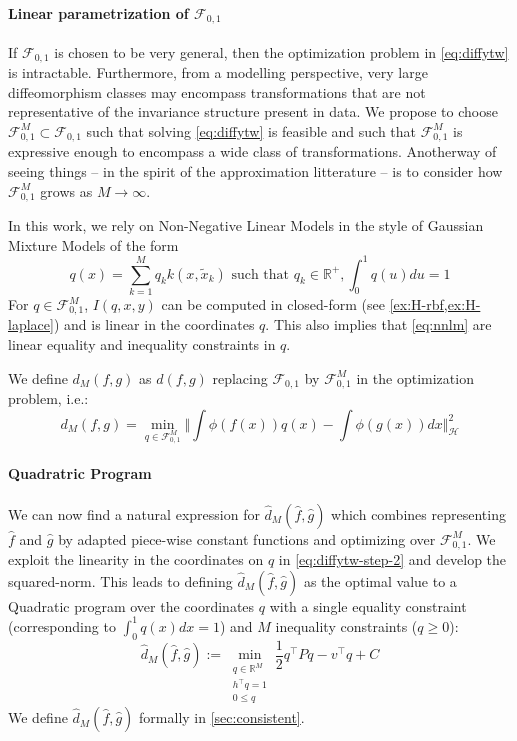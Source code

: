 \paragraph{Linear parametrization of $\mathcal F_{0,1}$} If $\mathcal F_{0,1}$ is chosen to be very general, then the optimization problem in \cref{eq:diffytw} is intractable. Furthermore, from a modelling perspective, very large diffeomorphism classes may encompass transformations that are not representative of the invariance structure present in data. We propose to choose $\mathcal F_{0,1}^M\subset \mathcal F_{0,1}$ such that solving \cref{eq:diffytw} is feasible and such that $\mathcal F_{0,1}^M$ is expressive enough to encompass a wide class of transformations. Anotherway of seeing things -- in the spirit of the approximation litterature -- is to consider how $\mathcal F_{0, 1}^M$ grows as $M \to \infty$.

In this work, we rely on Non-Negative Linear Models in the style of Gaussian Mixture Models of the form
\begin{equation}\label{eq:nnlm}
q(x) = \sum_{k=1}^M q_k k(x, \tilde x_k)\text{ such that } q_k\in\mathbb R^+, \int_0^1q(u)du=1
\end{equation}
For $q\in\mathcal F_{0,1}^M$, $I(q, x, y)$ can be computed in closed-form (see \cref{ex:H-rbf,ex:H-laplace}) and is linear in the coordinates $q$. This also implies that \cref{eq:nnlm} are linear equality and inequality constraints in $q$.

We define $d_M(f, g)$ as $d(f,g)$ replacing $\mathcal F_{0,1}$ by $\mathcal F_{0,1}^M$ in the optimization problem, i.e.:
\begin{equation}\label{eq:hat-d_M}
d_M(f, g) = \min_{q \in\mathcal F_{0,1}^M} \Vert \int \phi(f(x))q(x) - \int \phi(g(x))dx\Vert_\mathcal H^2
\end{equation}


\paragraph{Quadratric Program} We can now find a natural expression for $\hat d_M(\hat f, \hat g)$ which combines representing $\hat f$ and $\hat g$ by adapted piece-wise constant functions and optimizing over $\mathcal F_{0,1}^M$. We exploit the linearity in the coordinates on $q$ in \cref{eq:diffytw-step-2} and develop the squared-norm. This leads to defining $\hat d_M(\hat f, \hat g)$ as the optimal value to a Quadratic program over the coordinates $q$ with a single equality constraint (corresponding to $\int_0^1q(x)dx = 1$) and $M$ inequality constraints ($q \geq 0$):
\begin{equation}\label{eq:discrete-diffytw-informal}
\hat d_M(\hat f, \hat g) :=\min_{\substack{q\in\mathbb R^{M}\\h^\top q=1\\0 \leq q}}\frac{1}{2}q^\top Pq - v^\top q + C
\end{equation}
We define $\hat d_M(\hat f, \hat g)$ formally in \cref{sec:consistent}.

